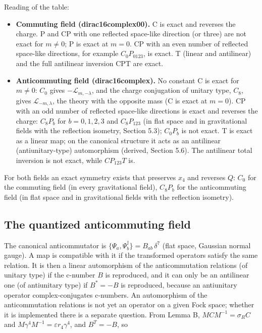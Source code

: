 \documentclass[11pt]{article}
\begin{document}
Reading of the table:

\begin{itemize}
\item \textbf{Commuting field (dirac16complex00).} C is exact and reverses the charge. P and CP with one reflected space-like direction (or three) are not exact for $m\ne0$; P is exact at $m=0$. CP with an even number of reflected space-like directions, for example $C_0P_{0123}$, is exact. T (linear and antilinear) and the full antilinear inversion CPT are exact.
\item \textbf{Anticommuting field (dirac16complex).} No constant C is exact for $m\ne0$: $C_0$ gives $-\mathcal L_{m,-\lambda}$, and the charge conjugation of unitary type, $C_8$, gives $\mathcal L_{-m,\lambda}$, the theory with the opposite mass (C is exact at $m=0$). CP with an odd number of reflected space-like directions is exact and reverses the charge: $C_8P_b$ for $b=0,1,2,3$ and $C_8P_{123}$ (in flat space and in gravitational fields with the reflection isometry, Section 5.3); $C_0P_b$ is not exact. T is exact as a linear map; on the canonical structure it acts as an antilinear (antiunitary-type) automorphism (derived, Section 5.6). The antilinear total inversion is not exact, while $CP_{123}T$ is.
\end{itemize}

For both fields an exact symmetry exists that preserves $x_4$ and reverses $Q$: $C_0$ for the commuting field (in every gravitational field), $C_8P_b$ for the anticommuting field (in flat space and in gravitational fields with the reflection isometry).

\subsection{The quantized anticommuting field}

The canonical anticommutator is $\{\Psi_a,\Psi^\dagger_b\}=B_{ab}\,\delta^7$ (flat space, Gaussian normal gauge). A map is compatible with it if the transformed operators satisfy the same relation. It is then a linear automorphism of the anticommutation relations (of unitary type) if the c-number $B$ is reproduced, and it can only be an antilinear one (of antiunitary type) if $B^\ast=-B$ is reproduced, because an antiunitary operator complex-conjugates c-numbers. An automorphism of the anticommutation relations is not yet an operator on a given Fock space; whether it is implemented there is a separate question. From Lemma B, $MCM^{-1}=\sigma_RC$ and $M\gamma^4M^{-1}=\varepsilon r_4\gamma^4$, and $B^T=-B$, so
\end{document}
